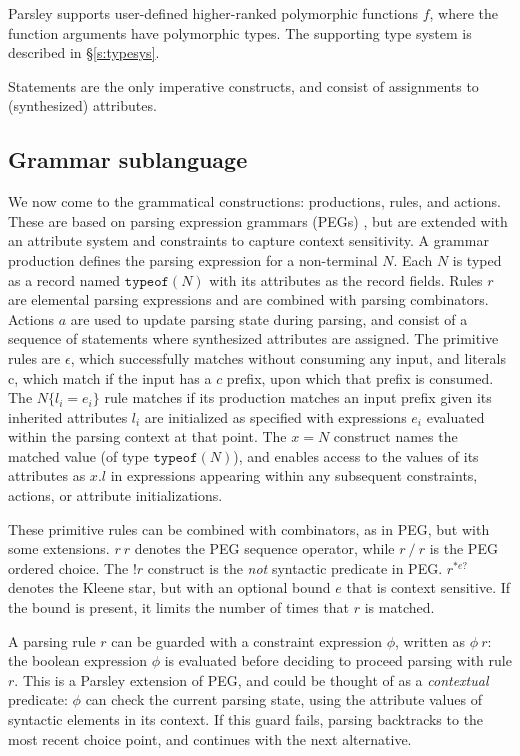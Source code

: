 \documentclass[letterpaper]{article}
\begin{document}
Parsley supports user-defined higher-ranked polymorphic functions $f$,
where the function arguments have polymorphic types.  The supporting
type system is described in \S\ref{s:typesys}.

Statements are the only imperative constructs, and consist of
assignments to (synthesized) attributes.

\subsection*{Grammar sublanguage}
\label{ss:lang:grammar}

We now come to the grammatical constructions: productions, rules, and
actions.  These are based on parsing expression grammars (PEGs)
\cite{ford2004popl}, but are extended with an attribute system and
constraints to capture context sensitivity.  A grammar production
defines the parsing expression for a non-terminal $N$.  Each $N$ is
typed as a record named $\texttt{typeof}(N)$ with its attributes as
the record fields.  Rules $r$ are elemental parsing expressions and
are combined with parsing combinators.  Actions $a$ are used to update
parsing state during parsing, and consist of a sequence of statements
where synthesized attributes are assigned.  The primitive rules are
$\epsilon$, which successfully matches without consuming any input,
and literals $\textrm{c}$, which match if the input has a $c$ prefix,
upon which that prefix is consumed.  The $N\{l_i=e_i\}$ rule matches
if its production matches an input prefix given its inherited
attributes $l_i$ are initialized as specified with expressions $e_i$
evaluated within the parsing context at that point.  The $x=N$
construct names the matched value (of type $\texttt{typeof}(N)$), and
enables access to the values of its attributes as $x.l$ in expressions
appearing within any subsequent constraints, actions, or attribute
initializations.

These primitive rules can be combined with combinators, as in PEG, but
with some extensions.  $r\ r$ denotes the PEG sequence operator, while
$r\ /\ r$ is the PEG ordered choice.  The $!r$ construct is the
\emph{not} syntactic predicate in PEG.  $r^{*e?}$ denotes the Kleene
star, but with an optional bound $e$ that is context sensitive.  If
the bound is present, it limits the number of times that $r$ is
matched.

A parsing rule $r$ can be guarded with a constraint expression $\phi$,
written as $\phi\ r$: the boolean expression $\phi$ is evaluated
before deciding to proceed parsing with rule $r$.  This is a Parsley
extension of PEG, and could be thought of as a \emph{contextual}
predicate: $\phi$ can check the current parsing state, using the
attribute values of syntactic elements in its context.  If this guard
fails, parsing backtracks to the most recent choice point, and
continues with the next alternative.
\end{document}
